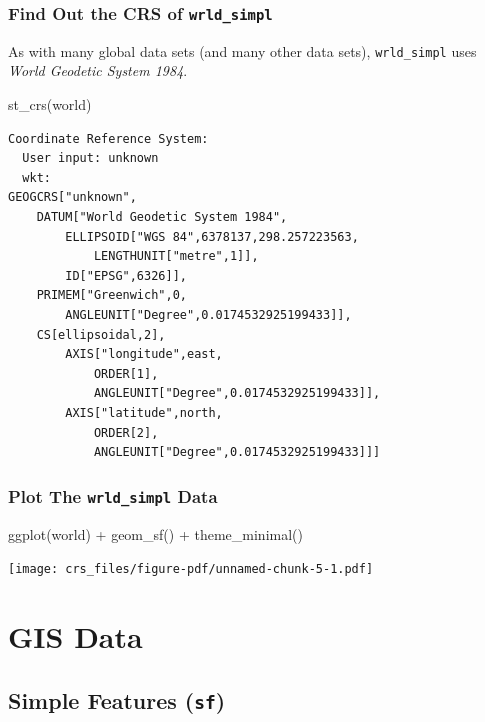 \documentclass[
  letterpaper,
  DIV=11,
  numbers=noendperiod,
  oneside]{scrreprt}
\newenvironment{Shaded}{\begin{snugshade}}{\end{snugshade}}
\newcommand{\FunctionTok}[1]{\textcolor[rgb]{0.28,0.35,0.67}{#1}}
\newcommand{\NormalTok}[1]{\textcolor[rgb]{0.00,0.23,0.31}{#1}}
\newcommand{\SpecialCharTok}[1]{\textcolor[rgb]{0.37,0.37,0.37}{#1}}
\begin{document}
\section{\texorpdfstring{Find Out the CRS of
\texttt{wrld\_simpl}}{Find Out the CRS of wrld\_simpl}}\label{find-out-the-crs-of-wrld_simpl}

As with many global data sets (and many other data sets),
\texttt{wrld\_simpl} uses \emph{World Geodetic System 1984}.

\begin{Shaded}
\begin{Highlighting}[]
\FunctionTok{st\_crs}\NormalTok{(world)}
\end{Highlighting}
\end{Shaded}

\begin{verbatim}
Coordinate Reference System:
  User input: unknown 
  wkt:
GEOGCRS["unknown",
    DATUM["World Geodetic System 1984",
        ELLIPSOID["WGS 84",6378137,298.257223563,
            LENGTHUNIT["metre",1]],
        ID["EPSG",6326]],
    PRIMEM["Greenwich",0,
        ANGLEUNIT["Degree",0.0174532925199433]],
    CS[ellipsoidal,2],
        AXIS["longitude",east,
            ORDER[1],
            ANGLEUNIT["Degree",0.0174532925199433]],
        AXIS["latitude",north,
            ORDER[2],
            ANGLEUNIT["Degree",0.0174532925199433]]]
\end{verbatim}

\section{\texorpdfstring{Plot The \texttt{wrld\_simpl}
Data}{Plot The wrld\_simpl Data}}\label{plot-the-wrld_simpl-data}

\begin{Shaded}
\begin{Highlighting}[]
\FunctionTok{ggplot}\NormalTok{(world) }\SpecialCharTok{+} 
  \FunctionTok{geom\_sf}\NormalTok{() }\SpecialCharTok{+}
  \FunctionTok{theme\_minimal}\NormalTok{()}
\end{Highlighting}
\end{Shaded}

\texttt{[image: crs\_files/figure-pdf/unnamed-chunk-5-1.pdf]}

\part{GIS Data}

\chapter{\texorpdfstring{Simple Features
(\texttt{sf})}{Simple Features (sf)}}\label{sec-sf}
\end{document}
